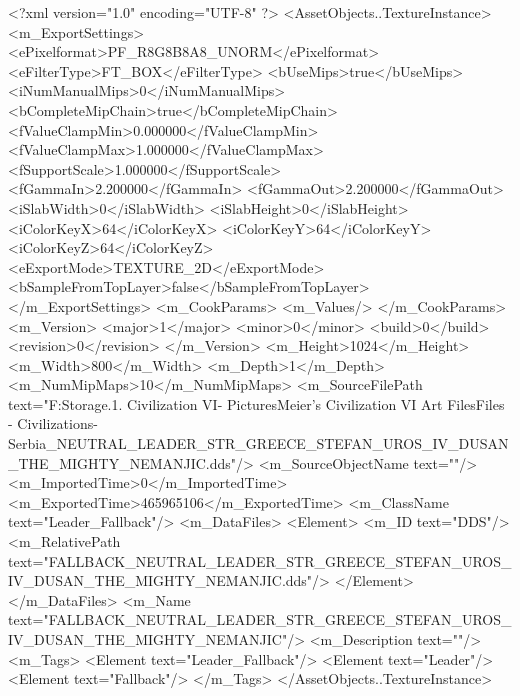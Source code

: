 <?xml version="1.0" encoding="UTF-8" ?>
<AssetObjects..TextureInstance>
	<m_ExportSettings>
		<ePixelformat>PF_R8G8B8A8_UNORM</ePixelformat>
		<eFilterType>FT_BOX</eFilterType>
		<bUseMips>true</bUseMips>
		<iNumManualMips>0</iNumManualMips>
		<bCompleteMipChain>true</bCompleteMipChain>
		<fValueClampMin>0.000000</fValueClampMin>
		<fValueClampMax>1.000000</fValueClampMax>
		<fSupportScale>1.000000</fSupportScale>
		<fGammaIn>2.200000</fGammaIn>
		<fGammaOut>2.200000</fGammaOut>
		<iSlabWidth>0</iSlabWidth>
		<iSlabHeight>0</iSlabHeight>
		<iColorKeyX>64</iColorKeyX>
		<iColorKeyY>64</iColorKeyY>
		<iColorKeyZ>64</iColorKeyZ>
		<eExportMode>TEXTURE_2D</eExportMode>
		<bSampleFromTopLayer>false</bSampleFromTopLayer>
	</m_ExportSettings>
	<m_CookParams>
		<m_Values/>
	</m_CookParams>
	<m_Version>
		<major>1</major>
		<minor>0</minor>
		<build>0</build>
		<revision>0</revision>
	</m_Version>
	<m_Height>1024</m_Height>
	<m_Width>800</m_Width>
	<m_Depth>1</m_Depth>
	<m_NumMipMaps>10</m_NumMipMaps>
	<m_SourceFilePath text="F:\Mod Storage\2.1. Civilization VI\Mods\Archive - Pictures\Sid Meier's Civilization VI Art Files\Art Files - Civilizations\Civilization - Serbia\FALLBACK_NEUTRAL_LEADER_STR_GREECE_STEFAN_UROS_IV_DUSAN_THE_MIGHTY_NEMANJIC.dds"/>
	<m_SourceObjectName text=""/>
	<m_ImportedTime>0</m_ImportedTime>
	<m_ExportedTime>465965106</m_ExportedTime>
	<m_ClassName text="Leader_Fallback"/>
	<m_DataFiles>
		<Element>
			<m_ID text="DDS"/>
			<m_RelativePath text="FALLBACK_NEUTRAL_LEADER_STR_GREECE_STEFAN_UROS_IV_DUSAN_THE_MIGHTY_NEMANJIC.dds"/>
		</Element>
	</m_DataFiles>
	<m_Name text="FALLBACK_NEUTRAL_LEADER_STR_GREECE_STEFAN_UROS_IV_DUSAN_THE_MIGHTY_NEMANJIC"/>
	<m_Description text=""/>
	<m_Tags>
		<Element text="Leader_Fallback"/>
		<Element text="Leader"/>
		<Element text="Fallback"/>
	</m_Tags>
</AssetObjects..TextureInstance>

